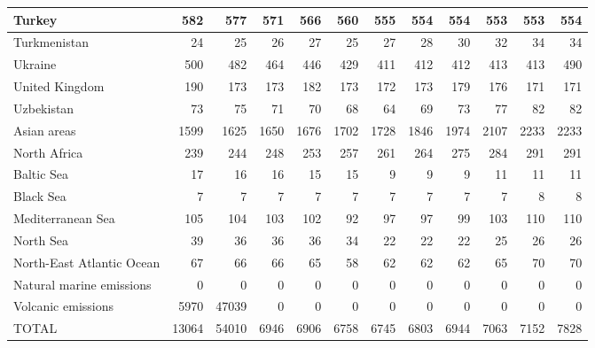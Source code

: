 \begin{table}
\begin{tabular}{|l|r|r|r|r|r|r|r|r|r|r|r|}
                        Turkey&    582&    577&    571&    566&    560&    555&    554&    554&    553&    553&    554\\\hline
                  Turkmenistan&     24&     25&     26&     27&     25&     27&     28&     30&     32&     34&     34\\\hline
                       Ukraine&    500&    482&    464&    446&    429&    411&    412&    412&    413&    413&    490\\\hline
                United Kingdom&    190&    173&    173&    182&    173&    172&    173&    179&    176&    171&    171\\\hline
                    Uzbekistan&     73&     75&     71&     70&     68&     64&     69&     73&     77&     82&     82\\\hline
                   Asian areas&   1599&   1625&   1650&   1676&   1702&   1728&   1846&   1974&   2107&   2233&   2233\\\hline
                  North Africa&    239&    244&    248&    253&    257&    261&    264&    275&    284&    291&    291\\\hline
                    Baltic Sea&     17&     16&     16&     15&     15&      9&      9&      9&     11&     11&     11\\\hline
                     Black Sea&      7&      7&      7&      7&      7&      7&      7&      7&      7&      8&      8\\\hline
             Mediterranean Sea&    105&    104&    103&    102&     92&     97&     97&     99&    103&    110&    110\\\hline
                     North Sea&     39&     36&     36&     36&     34&     22&     22&     22&     25&     26&     26\\\hline
     North-East Atlantic Ocean&     67&     66&     66&     65&     58&     62&     62&     62&     65&     70&     70\\\hline
      Natural marine emissions&      0&      0&      0&      0&      0&      0&      0&      0&      0&      0&      0\\\hline
            Volcanic emissions&   5970&  47039&      0&      0&      0&      0&      0&      0&      0&      0&      0\\\hline\hline
                         TOTAL&  13064&  54010&   6946&   6906&   6758&   6745&   6803&   6944&   7063&   7152&   7828\\\hline
 \end{tabular}
 \end{table}
 
